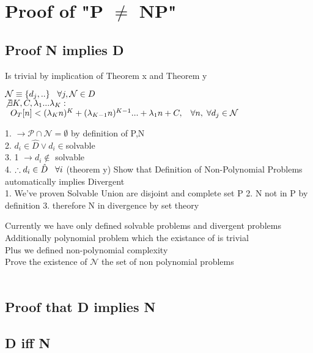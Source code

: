 \documentclass[11pt]{article}
\begin{document}
\newpage

\section{Proof of "P $\neq$ NP"}
\subsection{Proof N implies D}
Is trivial by implication of Theorem x and Theorem y
\begin{center}
$
\mathcal{N} \equiv \{ d_j,.. \} \hspace{3mm} \forall j, \mathcal{N} \in D
$
\\
$ 
\not \exists K,C,\lambda_1...\lambda_K : \hspace{2mm}
$
\\
$
\hspace{2mm} O_T[n] < (\lambda_K n)^K + (\lambda_{K-1} n)^{K-1}... + \lambda_1 n + C, \hspace{3mm} \forall n, \hspace{1mm} \forall d_j \in \mathcal{N}
$
\end{center}
1. $\rightarrow \mathcal{P} \cap \mathcal{N} = \emptyset$ by definition of P,N\\
2. $d_i \in \hat{D} \lor d_i \in $solvable\\
3. 1 $\rightarrow d_i \not \in$ solvable\\
4. $\therefore d_i \in \hat{D}\hspace{3mm} \forall i$ (theorem y)
Show that Definition of Non-Polynomial Problems automatically implies Divergent\\
1. We've proven Solvable Union are disjoint and complete set P
2. N not in P by definition
3. therefore N in divergence by set theory

Currently we have only defined solvable problems and divergent problems\\
Additionally polynomial problem which the existance of is trivial\\
Plus we defined non-polynomial complexity\\
Prove the existence of $\mathcal{N}$ the set of non polynomial problems\\
\\

\subsection{Proof that D implies N}
\subsection{D iff N}
\end{document}
